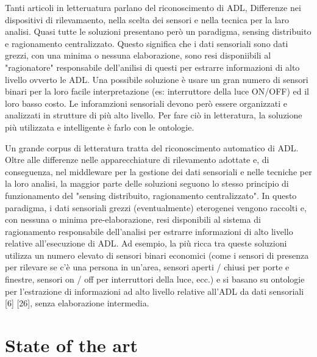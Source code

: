 \documentclass{thesisreport}
\begin{document}
Tanti articoli in letteruatura parlano del riconoscimento di ADL,
Differenze nei dispositivi di rilevamaento, nella scelta dei sensori e nella tecnica per la laro analisi.  
Quasi tutte le soluzioni presentano però un paradigma, sensing distribuito e ragionamento centralizzato. Questo significa che i dati sensoriali sono dati grezzi, con una minima o nessuna elaborazione, sono resi disponiibili al "ragionatore" responsabile dell'anilisi di questi per estrarre informazioni di alto livello ovverto le ADL. 
Una possibile soluzione è usare un gran numero di sensori binari per la loro facile interpretazione (es: interruttore della luce ON/OFF) ed il loro basso costo. Le inforamzioni sensoriali devono però essere organizzati e analizzati in strutture di più alto livello. Per fare ciò in letteratura, la soluzione più utilizzata e intelligente è farlo con le ontologie. 



Un grande corpus di letteratura tratta del riconoscimento automatico di ADL. Oltre alle differenze nelle apparecchiature di rilevamento adottate e, di conseguenza, nel middleware per la gestione dei dati sensoriali e nelle tecniche per la loro analisi, la maggior parte delle soluzioni seguono lo stesso principio di funzionamento del "sensing distribuito, ragionamento centralizzato". In questo paradigma, i dati sensoriali grezzi (eventualmente) eterogenei vengono raccolti e, con nessuna o minima pre-elaborazione, resi disponibili al sistema di ragionamento responsabile dell'analisi per estrarre informazioni di alto livello relative all'esecuzione di ADL. Ad esempio, la più ricca tra queste soluzioni utilizza un numero elevato di sensori binari economici (come i sensori di presenza per rilevare se c'è una persona in un'area, sensori aperti / chiusi per porte e finestre, sensori on / off per interruttori della luce, ecc.) e si basano su ontologie per l'estrazione di informazioni ad alto livello relative all'ADL da dati sensoriali [6] [26], senza elaborazione intermedia.

 
 
 \chapter{State of the art}
 
 
\end{document}
